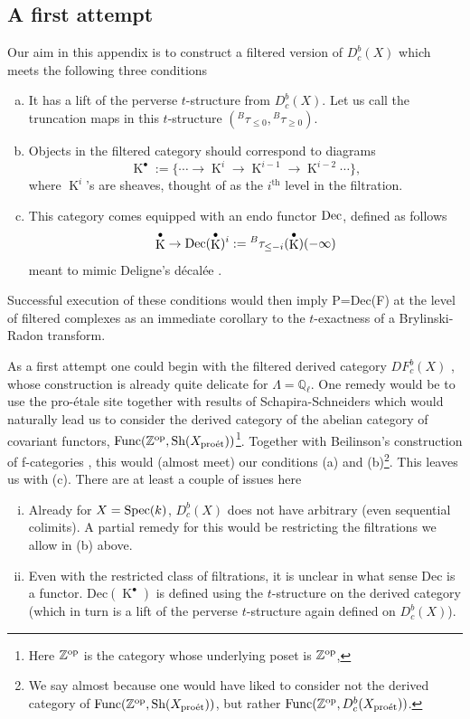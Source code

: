 \documentclass[12pt, reqno]{amsart}
\theoremstyle{plain}
\theoremstyle{definition}
\theoremstyle{definition}
\newcommand{\bbQ}{{\mathbb Q}}
\newcommand{\bbZ}{{\mathbb Z}}
\newcommand{\Spec}{{\rm Spec}}
\DeclareMathOperator{\KK}{K}
\begin{document}
\subsection{A first attempt}\label{first_attempt}
Our aim in this appendix is to construct a filtered version of $D^b_c(X)$ which meets the following three conditions

\begin{enumerate}[(a)]
    \item It has a lift of the perverse $t$-structure from $D^b_c(X)$. Let us call the truncation maps in this $t$-structure $(^{B}\tau_{\leq 0},{}^{B}\tau_{\geq 0})$.
    \item Objects in the filtered category should correspond to diagrams
    \[
    \KK^{\bullet}:=\{\cdots \to \KK^{i} \to \KK^{i-1} \to \KK^{i-2} \cdots\},
    \]
    \noindent where $\KK^i$'s are sheaves, thought of as the $i^{\mathrm{th}}$ level in the filtration.
    \item This category comes equipped with an endo functor $\textup{Dec}$, defined as follows
    \[
    \KK^{\bullet} \to \textup{Dec}(\KK^{\bullet})^{i}:={}^{B}\tau_{\leq -i}(\KK^{\bullet})(-\infty)
    \]
    meant to mimic Deligne's décalée \cite[1.3.3]{Del71}.
\end{enumerate}

Successful execution of these conditions would then imply P=Dec(F) at the level of filtered complexes as an immediate corollary to the $t$-exactness of a Brylinski-Radon transform.

As a first attempt one could begin with the filtered derived category $DF^b_c(X)$ \cite[1.1.2, (d)]{Del80}, whose construction is already quite delicate for $\Lambda=\bbQ_{\ell}$. One remedy would be to use the pro-\'etale site \cite{BS15} together with results of Schapira-Schneiders \cite{Schapira-Schneiders} which would naturally lead us to consider the derived category of the abelian category of covariant functors, $\textup{Func}(\bbZ^{\textup{op}},\textup{Sh}(X_{\textup{pro\'et}}))$\footnote{Here $\bbZ^{\textup{op}}$ is the category whose underlying poset is $\bbZ^{\textup{op}}$,}. Together with Beilinson's construction of f-categories \cite[Defintion A.1]{Bei87}, this would (almost meet) our conditions (a) and (b)\footnote{We say almost because one would have liked to consider not the derived category of $\textup{Func}(\bbZ^{\textup{op}},\textup{Sh}(X_{\textup{pro\'et}}))$, but rather $\textup{Func}(\bbZ^{\textup{op}},D^b_c(X_{\textup{pro\'et}}))$.}. This leaves us with (c). There are at least a couple of issues here
\begin{enumerate}[(i)]
    \item Already for $X=\Spec(k)$, $D^b_c(X)$ does not have arbitrary (even sequential colimits). A partial remedy for this would be restricting the filtrations we allow in (b) above.
    \item Even with the restricted class of filtrations, it is unclear in what sense $\mathrm{Dec}$ is a functor. $\mathrm{Dec}(\KK^{\bullet})$ is defined using the $t$-structure on the derived category (which in turn is a lift of the perverse $t$-structure again defined on $D^b_c(X)$).
\end{enumerate}
\end{document}
